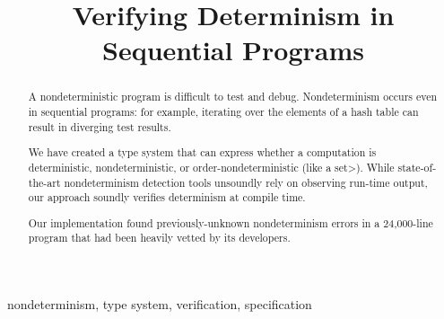 \documentclass[conference,keeplastbox]{IEEEtran}
\begin{document}
\title{Verifying Determinism in Sequential Programs}

\author{
}

\maketitle

\begin{abstract}
A nondeterministic program is difficult to test and debug.
Nondeterminism occurs even in sequential programs: for example, 
iterating over the elements of a hash table can result in diverging test results.

We have created a type system that can express whether a computation is 
deterministic, nondeterministic, or order-nondeterministic (like a \<set>).
While state-of-the-art
nondeterminism detection tools unsoundly rely on observing run-time output, our approach
soundly verifies determinism at compile time.

Our implementation found
previously-unknown nondeterminism errors in a 24,000-line program that had been heavily
vetted by its developers.
\end{abstract}

\begin{IEEEkeywords}
nondeterminism, type system, verification, specification
\end{IEEEkeywords}








\end{document}
